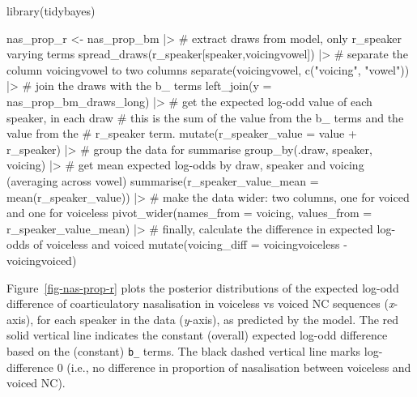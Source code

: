 \documentclass[
  authoryear,
  preprint,
  3p]{elsarticle}
\newenvironment{Shaded}{\begin{snugshade}}{\end{snugshade}}
\newcommand{\AttributeTok}[1]{\textcolor[rgb]{0.40,0.45,0.13}{#1}}
\newcommand{\CommentTok}[1]{\textcolor[rgb]{0.37,0.37,0.37}{#1}}
\newcommand{\FunctionTok}[1]{\textcolor[rgb]{0.28,0.35,0.67}{#1}}
\newcommand{\NormalTok}[1]{\textcolor[rgb]{0.00,0.23,0.31}{#1}}
\newcommand{\OtherTok}[1]{\textcolor[rgb]{0.00,0.23,0.31}{#1}}
\newcommand{\SpecialCharTok}[1]{\textcolor[rgb]{0.37,0.37,0.37}{#1}}
\newcommand{\StringTok}[1]{\textcolor[rgb]{0.13,0.47,0.30}{#1}}
\begin{document}
\begin{Shaded}
\begin{Highlighting}[]
\FunctionTok{library}\NormalTok{(tidybayes)}

\NormalTok{nas\_prop\_r }\OtherTok{\textless{}{-}}\NormalTok{ nas\_prop\_bm }\SpecialCharTok{|\textgreater{}} 
  \CommentTok{\# extract draws from model, only \textasciigrave{}r\_speaker\textasciigrave{} varying terms}
  \FunctionTok{spread\_draws}\NormalTok{(r\_speaker[speaker,voicingvowel]) }\SpecialCharTok{|\textgreater{}} 
  \CommentTok{\# separate the column voicingvowel to two columns}
  \FunctionTok{separate}\NormalTok{(voicingvowel, }\FunctionTok{c}\NormalTok{(}\StringTok{"voicing"}\NormalTok{, }\StringTok{"vowel"}\NormalTok{)) }\SpecialCharTok{|\textgreater{}} 
  \CommentTok{\# join the draws with the \textasciigrave{}b\_\textasciigrave{} terms}
  \FunctionTok{left\_join}\NormalTok{(}\AttributeTok{y =}\NormalTok{ nas\_prop\_bm\_draws\_long) }\SpecialCharTok{|\textgreater{}} 
  \CommentTok{\# get the expected log{-}odd value of each speaker, in each draw}
  \CommentTok{\# this is the sum of the \textasciigrave{}value\textasciigrave{} from the b\_ terms and the value from the}
  \CommentTok{\# r\_speaker term.}
  \FunctionTok{mutate}\NormalTok{(}\AttributeTok{r\_speaker\_value =}\NormalTok{ value }\SpecialCharTok{+}\NormalTok{ r\_speaker) }\SpecialCharTok{|\textgreater{}} 
  \CommentTok{\# group the data for summarise}
  \FunctionTok{group\_by}\NormalTok{(.draw, speaker, voicing) }\SpecialCharTok{|\textgreater{}} 
  \CommentTok{\# get mean expected log{-}odds by draw, speaker and voicing (averaging across vowel)}
  \FunctionTok{summarise}\NormalTok{(}\AttributeTok{r\_speaker\_value\_mean =} \FunctionTok{mean}\NormalTok{(r\_speaker\_value)) }\SpecialCharTok{|\textgreater{}} 
  \CommentTok{\# make the data wider: two columns, one for voiced and one for voiceless}
  \FunctionTok{pivot\_wider}\NormalTok{(}\AttributeTok{names\_from =}\NormalTok{ voicing, }\AttributeTok{values\_from =}\NormalTok{ r\_speaker\_value\_mean) }\SpecialCharTok{|\textgreater{}} 
  \CommentTok{\# finally, calculate the difference in expected log{-}odds of voiceless and voiced}
  \FunctionTok{mutate}\NormalTok{(}\AttributeTok{voicing\_diff =}\NormalTok{ voicingvoiceless }\SpecialCharTok{{-}}\NormalTok{ voicingvoiced)}
\end{Highlighting}
\end{Shaded}

Figure~\ref{fig-nas-prop-r} plots the posterior distributions of the
expected log-odd difference of coarticulatory nasalisation in voiceless
vs voiced NC sequences (\emph{x}-axis), for each speaker in the data
(\emph{y}-axis), as predicted by the model. The red solid vertical line
indicates the constant (overall) expected log-odd difference based on
the (constant) \texttt{b\_} terms. The black dashed vertical line marks
log-difference 0 (i.e., no difference in proportion of nasalisation
between voiceless and voiced NC).
\end{document}
